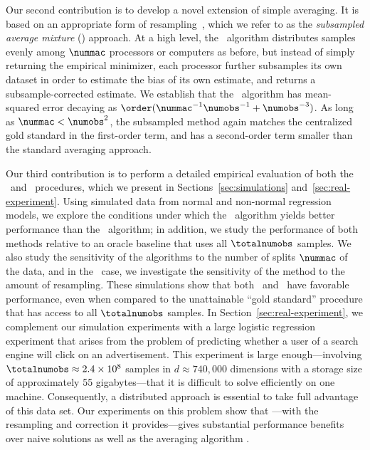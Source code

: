 \documentclass[11pt,twoside]{article}
\theoremstyle{definition}
\begin{document}
Our second contribution is to develop a novel extension of simple
averaging.  It is based on an appropriate form of
resampling~\citep{EfronTi93, Hall92, PolitisRoWo99}, which we refer to
as the \emph{subsampled average mixture} (\savgm) approach. At a high
level, the \savgm\ algorithm distributes samples evenly among
$\nummac$ processors or computers as before, but instead of simply
returning the empirical minimizer, each processor further subsamples
its own dataset in order to estimate the bias of its own estimate, and
returns a subsample-corrected estimate.  We establish that the
\savgm\ algorithm has mean-squared error decaying as
$\order(\nummac^{-1} \numobs^{-1} + \numobs^{-3})$.  As long as
$\nummac < \numobs^2$, the subsampled method again matches the
centralized gold standard in the first-order term, and has a
second-order term smaller than the standard averaging approach.

Our third contribution is to perform a detailed empirical evaluation
of both the \avgm\ and \savgm\ procedures, which we present in
Sections~\ref{sec:simulations} and~\ref{sec:real-experiment}. Using
simulated data from normal and non-normal regression models, we
explore the conditions under which the \savgm\ algorithm yields better
performance than the \avgm\ algorithm; in addition, we study the
performance of both methods relative to an oracle baseline that uses
all $\totalnumobs$ samples. We also study the sensitivity of the
algorithms to the number of splits $\nummac$ of the data, and in the
\savgm\ case, we investigate the sensitivity of the method to the
amount of resampling. These simulations show that both \avgm\ and
\savgm\ have favorable performance, even when compared to the
unattainable ``gold standard'' procedure that has access to all
$\totalnumobs$ samples. In Section~\ref{sec:real-experiment}, we
complement our simulation experiments with a large logistic regression
experiment that arises from the problem of predicting whether a user
of a search engine will click on an advertisement. This experiment is
large enough---involving $\totalnumobs \approx 2.4 \times 10^8$
samples in $d \approx 740,000$ dimensions with a storage size of
approximately 55 gigabytes---that it is difficult to solve efficiently
on one machine.  Consequently, a distributed approach is essential to
take full advantage of this data set.  Our experiments on this
problem show that \savgm---with the resampling and correction
it provides---gives substantial performance benefits over naive
solutions as well as the averaging algorithm \avgm.
\end{document}
